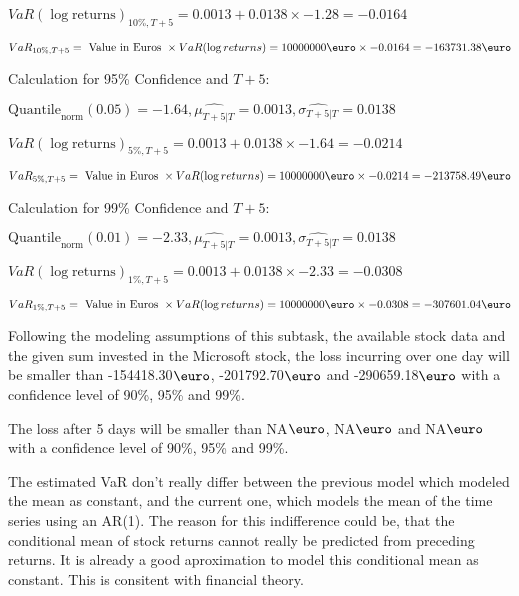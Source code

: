 \indent\indent $VaR(\log \text{returns})_{10\%, T + 5} = 0.0013 + 0.0138\times-1.28 = -0.0164$

\indent\indent $VaR_{10\%, T + 5} = \text{ Value in Euros } \times VaR(\log returns) = 10 000 000 \text{\euro} \times-0.0164 = -163731.38 \text{\euro}$\newline




Calculation for 95\% Confidence and $T+5$:

\indent\indent $\text{Quantile}_\text{norm}(0.05) = -1.64,\hat{\mu_{T+5|T}} = 0.0013, \hat{\sigma_{T+5|T}} = 0.0138$

\indent\indent $VaR(\log \text{returns})_{5\%, T + 5} = 0.0013 + 0.0138\times-1.64 = -0.0214$

\indent\indent $VaR_{5\%, T + 5} = \text{ Value in Euros } \times VaR(\log returns) = 10 000 000 \text{\euro} \times-0.0214 = -213758.49 \text{\euro}$\newline




Calculation for 99\% Confidence and $T+5$:

\indent\indent $\text{Quantile}_\text{norm}(0.01) = -2.33,\hat{\mu_{T+5|T}} = 0.0013, \hat{\sigma_{T+5|T}} = 0.0138$

\indent\indent $VaR(\log \text{returns})_{1\%, T + 5} = 0.0013 + 0.0138\times-2.33 = -0.0308$

\indent\indent $VaR_{1\%, T + 5} = \text{ Value in Euros } \times VaR(\log returns) = 10 000 000 \text{\euro} \times-0.0308 = -307601.04 \text{\euro}$\newline


Following the modeling assumptions of this subtask, the available stock data and the given sum invested in the Microsoft stock, the loss incurring over one day will be smaller than -154418.30$\text{\euro}$, -201792.70$\text{\euro}$  and -290659.18$\text{\euro}$  with a confidence level of 90\%, 95\%  and 99\%.

The loss after 5 days will be smaller than NA$\text{\euro}$, NA$\text{\euro}$  and NA$\text{\euro}$  with a confidence level of 90\%, 95\%  and 99\%.

The estimated VaR don't really differ between the previous model which modeled the mean as constant, and the current one, which models the mean of the time series using an AR(1). 
The reason for this indifference could be, that the conditional mean of stock returns cannot really be predicted from preceding returns. It is already a good aproximation to model this conditional mean as constant. This is consitent with financial theory.

